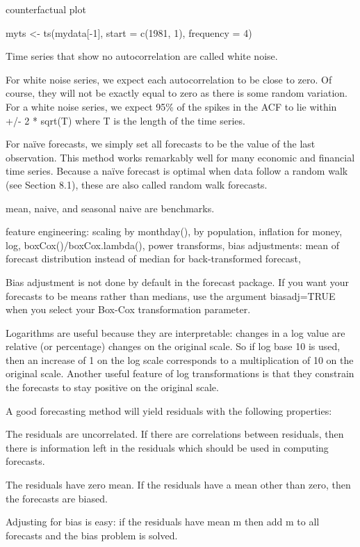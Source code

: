 \documentclass[]{book}
\begin{document}
counterfactual plot

myts \textless{}- ts(mydata{[}-1{]}, start = c(1981, 1), frequency = 4)

Time series that show no autocorrelation are called white noise.

For white noise series, we expect each autocorrelation to be close to
zero. Of course, they will not be exactly equal to zero as there is some
random variation. For a white noise series, we expect 95\% of the spikes
in the ACF to lie within\\
+/- 2 * sqrt(T) where T is the length of the time series.

For naïve forecasts, we simply set all forecasts to be the value of the
last observation. This method works remarkably well for many economic
and financial time series. Because a naïve forecast is optimal when data
follow a random walk (see Section 8.1), these are also called random
walk forecasts.

mean, naive, and seasonal naive are benchmarks.

feature engineering: scaling by monthday(), by population, inflation for
money, log, boxCox()/boxCox.lambda(), power transforms, bias
adjustments: mean of forecast distribution instead of median for
back-transformed forecast,

Bias adjustment is not done by default in the forecast package. If you
want your forecasts to be means rather than medians, use the argument
biasadj=TRUE when you select your Box-Cox transformation parameter.

Logarithms are useful because they are interpretable: changes in a log
value are relative (or percentage) changes on the original scale. So if
log base 10 is used, then an increase of 1 on the log scale corresponds
to a multiplication of 10 on the original scale. Another useful feature
of log transformations is that they constrain the forecasts to stay
positive on the original scale.

A good forecasting method will yield residuals with the following
properties:

The residuals are uncorrelated. If there are correlations between
residuals, then there is information left in the residuals which should
be used in computing forecasts.

The residuals have zero mean. If the residuals have a mean other than
zero, then the forecasts are biased.

Adjusting for bias is easy: if the residuals have mean m then add m to
all forecasts and the bias problem is solved.
\end{document}
